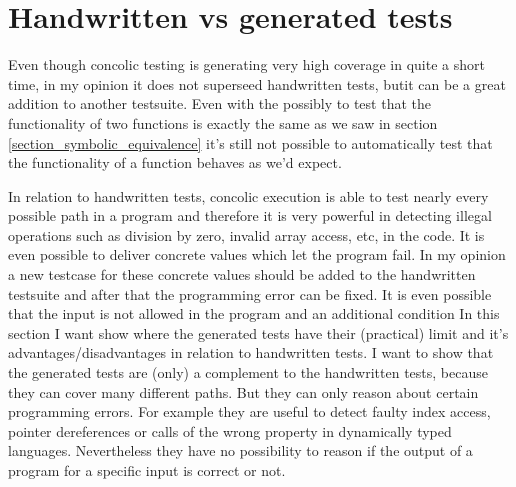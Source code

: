 \section{Handwritten vs generated tests}
Even though concolic testing is generating very high coverage in quite a short time, in my opinion it does not superseed handwritten tests, butit can be a great addition to another testsuite. 
Even with the possibly to test that the functionality of two functions is exactly the same as we saw in section \ref{section_symbolic_equivalence} it's still not possible to automatically test that the functionality of a function behaves as we'd expect.

In relation to handwritten tests, concolic execution is able to test nearly every possible path in a program and therefore it is very powerful in detecting illegal operations such as division by zero, invalid array access, etc, in the code. It is even possible to deliver concrete values which let the program fail. In my opinion a new testcase for these concrete values should be added to the handwritten testsuite and after that the programming error can be fixed. It is even possible that the input is not allowed in the program and an additional condition 
In this section I want show where the generated tests have their (practical) limit and it's advantages/disadvantages in relation to handwritten tests.
I want to show that the generated tests are (only) a complement to the handwritten tests, because they can cover many different paths. But they can only reason about certain programming errors. For example they are useful to detect faulty index access, pointer dereferences or calls of the wrong property in dynamically typed languages. Nevertheless they have no possibility to reason if the output of a program for a specific input is correct or not.